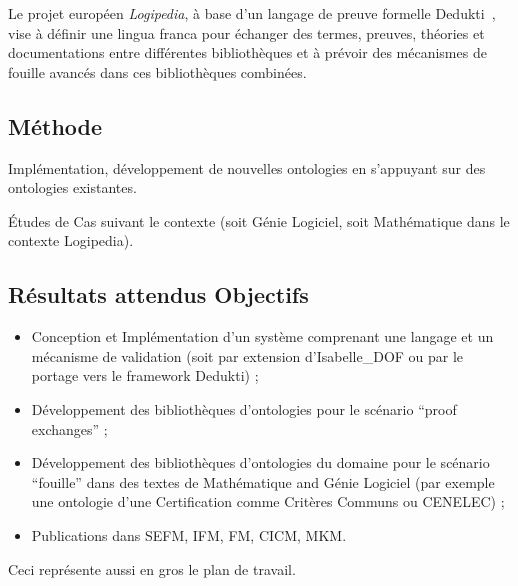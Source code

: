 \documentclass[a4paper,10pt]{article}
\begin{document}
Le projet européen \emph{Logipedia},
à base d'un langage de preuve formelle Dedukti~\cite{dedukti}, vise
à définir une lingua franca
pour échanger des termes, preuves, théories et documentations
entre différentes bibliothèques
et à prévoir des mécanismes de fouille avancés
dans ces bibliothèques combinées.

\subsection*{Méthode}

Implémentation, développement de nouvelles ontologies
en s'appuyant sur des ontologies existantes.

Études de Cas suivant le contexte
(soit Génie Logiciel, soit Mathématique dans le contexte Logipedia).

\subsection*{Résultats attendus \textendash{}  Objectifs}

\begin{itemize}
  \item
    Conception et Implémentation d'un système comprenant
    une langage et un mécanisme de validation
    (soit par extension d'Isabelle\_DOF
    ou par le portage vers le framework Dedukti) ;
  \item
    Développement des bibliothèques d'ontologies
    pour le scénario \enquote{proof exchanges} ;
  \item
    Développement des bibliothèques d'ontologies du domaine
    pour le scénario \enquote{fouille} dans des textes
    de Mathématique and Génie Logiciel
    (par exemple une ontologie
    d'une Certification comme Critères Communs ou CENELEC) ;
  \item
    Publications dans SEFM, IFM, FM, CICM, MKM\@.
\end{itemize}

Ceci représente aussi en gros le plan de travail.



\end{document}
